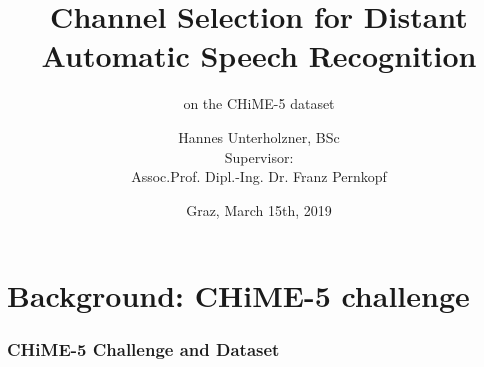 \documentclass{beamer}
\title[CS for Distant ASR]{Channel Selection for Distant Automatic Speech Recognition}
\subtitle[on CHiME-5]{on the CHiME-5 dataset}
\author[H. Unterholzner]{Hannes Unterholzner, BSc \\ [1em]{ Supervisor: \\ Assoc.Prof. Dipl.-Ing. Dr. Franz Pernkopf}}
\date{Graz, March 15th, 2019}
\institute[SPSC]{Signal Processing and Speech Communication Laboratory}
\begin{document}
\begin{frame}[plain]
  \titlepage
\end{frame}




\section{Background: CHiME-5 challenge}
\begin{frame}
  \frametitle{CHiME-5 Challenge and Dataset}
  
  \vspace{-.5em}
  \begin{minipage}[t]{0.49\textwidth}  


\end{minipage}
\end{frame}
\end{document}
